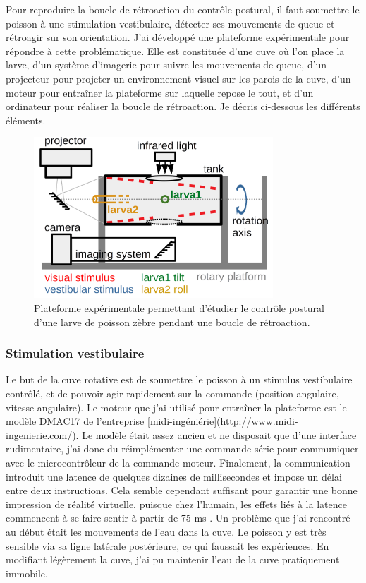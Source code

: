 Pour reproduire la boucle de rétroaction du contrôle postural, il faut soumettre le poisson à une stimulation vestibulaire, détecter ses mouvements de queue et rétroagir sur son orientation. J'ai développé une plateforme expérimentale pour répondre à cette problématique. Elle est constituée d'une cuve où l'on place la larve, d'un système d'imagerie pour suivre les mouvements de queue, d'un projecteur pour projeter un environnement visuel sur les parois de la cuve, d'un moteur pour entraîner la plateforme sur laquelle repose le tout, et d'un ordinateur pour réaliser la boucle de rétroaction. Je décris ci-dessous les différents éléments.

\begin{figure}
\centering
\includegraphics[width=0.8\textwidth]{./files/schema_manip.png}
\caption{Plateforme expérimentale permettant d'étudier le contrôle postural d'une larve de poisson zèbre pendant une boucle de rétroaction.}
\end{figure}

\subsubsection{Stimulation vestibulaire}
Le but de la cuve rotative est de soumettre le poisson à un stimulus vestibulaire contrôlé, et de pouvoir agir rapidement sur la commande (position angulaire, vitesse angulaire). Le moteur que j'ai utilisé pour entraîner la plateforme est le modèle DMAC17 de l'entreprise [midi-ingéniérie](http://www.midi-ingenierie.com/). Le modèle était assez ancien et ne disposait que d'une interface rudimentaire, j'ai donc du réimplémenter une commande série pour communiquer avec le microcontrôleur de la commande moteur. Finalement, la communication introduit une latence de quelques dizaines de millisecondes et impose un délai entre deux instructions. Cela semble cependant suffisant pour garantir une bonne impression de réalité virtuelle, puisque chez l'humain, les effets liés à la latence commencent à se faire sentir à partir de 75 ms \cite{waltemate_impact_2016}. Un problème que j'ai rencontré au début était les mouvements de l'eau dans la cuve. Le poisson y est très sensible via sa ligne latérale postérieure, ce qui faussait les expériences. En modifiant légèrement la cuve, j'ai pu maintenir l'eau de la cuve pratiquement immobile.

